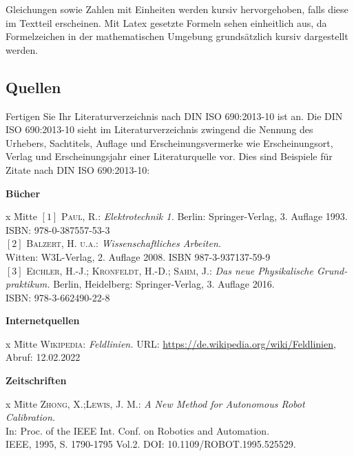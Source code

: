 Gleichungen sowie Zahlen mit Einheiten werden kursiv hervorgehoben, falls diese im Textteil erscheinen.
Mit Latex gesetzte Formeln sehen einheitlich aus, da Formelzeichen in der mathematischen Umgebung grundsätzlich kursiv dargestellt werden.

\subsection{Quellen}
Fertigen Sie Ihr Literaturverzeichnis nach DIN ISO 690:2013-10 ist an.
Die DIN ISO 690:2013-10 sieht im Literaturverzeichnis zwingend die Nennung des Urhebers, Sachtitels, Auflage und Erscheinungsvermerke wie Erscheinungsort, Verlag und Erscheinungsjahr einer Literaturquelle vor.
\newpage
Dies sind Beispiele für Zitate nach DIN ISO 690:2013-10:

\textbf{Bücher}
  \begin{tabbing}
    [1]x \= Mitte  \kill
    $[1]$ \> \textsc{Paul, R.}: \textit{Elektrotechnik 1.} Berlin: Springer-Verlag, 3. Auflage 1993.\\
		\> ISBN: 978-0-387557-53-3\\
		$[2]$ \> \textsc{Balzert, H. u.a.}: \textit{Wissenschaftliches Arbeiten.} \\
		\> Witten: W3L-Verlag, 2. Auflage 2008. ISBN 987-3-937137-59-9\\
		$[3]$ \> \textsc{Eichler, H.-J.; Kronfeldt, H.-D.; Sahm, J.}: \textit{Das neue Physikalische Grund-}\\
		\>\textit{praktikum.} Berlin, Heidelberg: Springer-Verlag, 3. Auflage 2016.\\
		\> ISBN: 978-3-662490-22-8
  \end{tabbing}

\textbf{Internetquellen}
  \begin{tabbing}
    [1]x \= Mitte  \kill
    [4] \> \textsc{Wikipedia}: \textit{Feldlinien.} URL: \url{https://de.wikipedia.org/wiki/Feldlinien}, \\
		\>Abruf: 12.02.2022\\
  \end{tabbing}

\textbf{Zeitschriften}
  \begin{tabbing}
    [1]x \= Mitte  \kill
    [5] \> \textsc{Zhong, X.;Lewis, J. M.}: \textit{A New Method for Autonomous Robot Calibration.} \\
		\>In: Proc. of the IEEE Int. Conf. on Robotics and Automation. \\
		\>IEEE, 1995, S. 1790-1795 Vol.2. DOI: 10.1109/ROBOT.1995.525529.\\
  \end{tabbing}



